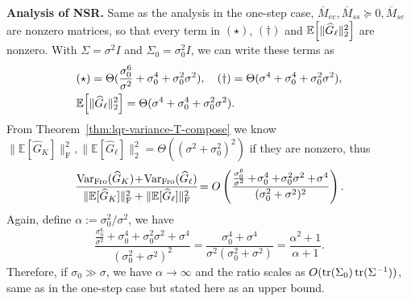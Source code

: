 \textbf{Analysis of NSR.} Same as the analysis in the one-step case, $\overline M_{ee}, \overline M_{ss} \succeq 0, \overline M_{se}$ are nonzero matrices, so that every term in $(\star)$, $(\dagger)$ and ${\mathbb{E}}\!\left[\|\widehat G_\ell\|_2^2\right]$ are nonzero. With $\Sigma = \sigma^2 I$ and $\Sigma_0 = \sigma_0^2 I$, we can write these terms as
\begin{align*}
\vspace{-2mm}
&(\star) = \Theta(\frac{\sigma_0^6}{\sigma^2} + \sigma_0^4 + \sigma_0^2 \sigma^2), \quad (\dagger) = \Theta(\sigma^4 + \sigma_0^4 + \sigma_0^2 \sigma^2),\\
& \E\!\left[\|\widehat G_\ell\|_2^2\right] = \Theta(\sigma^4 + \sigma_0^4 + \sigma_0^2 \sigma^2).
\vspace{-2mm}
\end{align*}
From Theorem~\ref{thm:lqr-variance-T-compose} we know $\|\mathbb{E}[\widehat G_K]\|_{\mathrm{F}}^2, \|\mathbb{E}[\widehat G_\ell]\|_2^2= \Theta((\sigma^2 + \sigma_0^2)^2)$ if they are nonzero, thus
$$
\frac{\operatorname{Var_{Fro}}(\widehat G_K)\!+\!\operatorname{Var_{Fro}}(\widehat G_\ell)}{\|\mathbb{E}[\widehat G_K]\|_{\mathrm{F}}^2 + \|\mathbb{E}[\widehat G_\ell]\|_{\mathrm{F}}^2}\!=O\left(\frac{\frac{\sigma_0^6}{\sigma^2} +\!\sigma_0^4 +\!\sigma_0^2 \sigma^2 +\!\sigma^4}{(\sigma_0^2 + \sigma^2)^2}\right).
$$
Again, define $\alpha:=\sigma_0^2/\sigma^2$, we have
\[
\frac{\frac{\sigma_0^6}{\sigma^2}+\sigma_0^4+\sigma_0^2 \sigma^2+\sigma^4}{(\sigma_0^2+\sigma^2)^2}
=\frac{\sigma_0^4+\sigma^4}{\sigma^2(\sigma_0^2+\sigma^2)}
=\frac{\alpha^2+1}{\alpha+1}.
\]
Therefore, if $\sigma_0 \gg \sigma$, we have \(\alpha \to \infty\) and the ratio scales as \(O(\operatorname{tr}(\Sigma_0)\operatorname{tr}(\Sigma^{-1}))\), same as in the one-step case but stated here as an upper bound.



